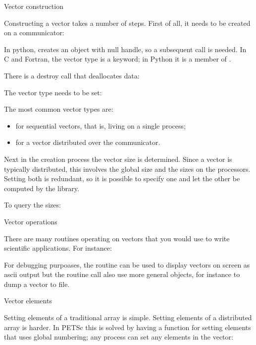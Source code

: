  {Vector construction}

Constructing a vector takes a number of steps. First of all, it needs
to be created on a communicator:
%

\begin{pythonnote}
  In python,  creates an object with null handle, so a
  subsequent  call is needed.
  In C and Fortran, the vector type is a keyword; in Python it is a
  member of .
\end{pythonnote}

There is a destroy call that deallocates data:
%

The vector type needs to be set:
%

The most common vector types are:
\begin{itemize}
\item {} for sequential vectors, that is, living on a single process;
\item {} for a vector distributed over the communicator.
\end{itemize}

Next in the creation process the vector size is determined. Since a
vector is typically distributed, this involves the global size and the
sizes on the processors. Setting both is redundant, so it is possible
to specify one and let the other be computed by the library.
%

To query the sizes:
%

 {Vector operations}

There are many routines operating on vectors that you would
use to write scientific applications. For instance:
%

For debugging purpoases,
the  routine can be used to display vectors on screen as
ascii output
%
%
but the routine call also use more general  objects, for
instance to dump a vector to file.

 {Vector elements}

Setting elements of a traditional array is simple. Setting elements of
a distributed array is harder. In PETSc this is solved by having a
function for setting elements that uses global numbering; any
process can set any elements in the vector:
%

